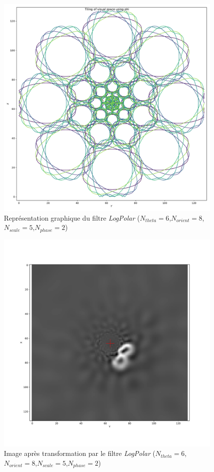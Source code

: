 \begin{figure}[th]
\centering
\includegraphics[scale=0.35]{Figures/LogPolar_shape}
\decoRule %
\caption[Figure]{Représentation graphique du filtre \textit{LogPolar} ($N_{theta}=6$,$N_{orient}=8$,$N_{scale}=5$,$N_{phase}=2$) }
\label{fig:LogPolar_shape}
\end{figure}

\begin{figure}[th]
\centering
\includegraphics[scale=0.35]{Figures/LogPolar_effect}
\decoRule %
\caption[Figure]{Image après transformation par le filtre \textit{LogPolar} ($N_{theta}=6$,$N_{orient}=8$,$N_{scale}=5$,$N_{phase}=2$) }
\label{fig:LogPolar_effect}
\end{figure}

